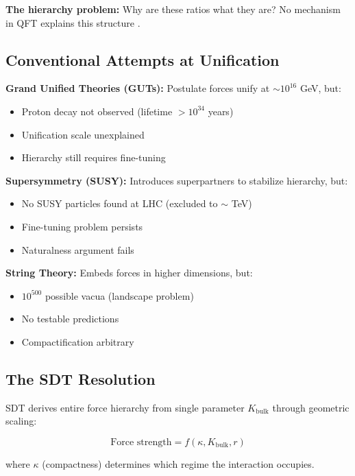 \textbf{The hierarchy problem:} Why are these ratios what they are? No mechanism in QFT explains this structure \cite{susskind1979dynamics, witten1981dynamical}.

\subsection{Conventional Attempts at Unification}

\textbf{Grand Unified Theories (GUTs):} Postulate forces unify at $\sim 10^{16}$ GeV, but:
\begin{itemize}
\item Proton decay not observed (lifetime $> 10^{34}$ years)
\item Unification scale unexplained
\item Hierarchy still requires fine-tuning
\end{itemize}

\textbf{Supersymmetry (SUSY):} Introduces superpartners to stabilize hierarchy, but:
\begin{itemize}
\item No SUSY particles found at LHC (excluded to $\sim$ TeV)
\item Fine-tuning problem persists
\item Naturalness argument fails
\end{itemize}

\textbf{String Theory:} Embeds forces in higher dimensions, but:
\begin{itemize}
\item $10^{500}$ possible vacua (landscape problem)
\item No testable predictions
\item Compactification arbitrary
\end{itemize}

\subsection{The SDT Resolution}

SDT derives entire force hierarchy from single parameter $K_{\text{bulk}}$ through geometric scaling:

\begin{equation}
\boxed{\text{Force strength} = f(\kappa, K_{\text{bulk}}, r)}
\end{equation}

where $\kappa$ (compactness) determines which regime the interaction occupies.

